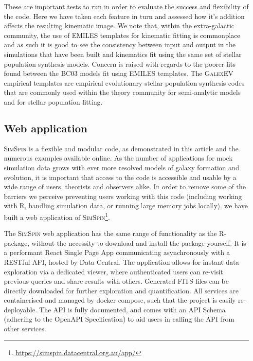 \documentclass[
  journal=pasa,
  manuscript=research-paper, %
  year=2020,
  volume=37,
]{cup-journal}
\newcommand{\simspin}[1]{\textsc{SimSpin}#1} %
\begin{document}
\vspace{0.5cm}

These are important tests to run in order to evaluate the success and flexibility of the code. 
Here we have taken each feature in turn and assessed how it's addition affects the resulting kinematic image. 
We note that, within the extra-galactic community, the use of EMILES templates for kinematic fitting is commonplace and as such it is good to see the consistency between input and output in the simulations that have been built and kinematics fit using the same set of stellar population synthesis models. 
Concern is raised with regards to the poorer fits found between the BC03 models fit using EMILES templates. 
The \textsc{GalexEV} empirical templates are empirical evolutionary stellar population synthesis codes that are commonly used within the theory community for semi-analytic models and for stellar population fitting. 

\vspace{0.5cm}

\subsection{Web application}
\simspin{} is a flexible and modular code, as demonstrated in this article and the numerous examples available online. 
As the number of applications for mock simulation data grows with ever more resolved models of galaxy formation and evolution, it is important that access to the code is accessible and usable by a wide range of users, theorists and observers alike.
In order to remove some of the barriers we perceive preventing users working with this code (including working with \small{R}, handling simulation data, or running large memory jobs locally), we have built a web application of \simspin  \footnote{\url{https://simspin.datacentral.org.au/app/}}. 

The \simspin{} web application has the same range of functionality as the R-package, without the necessity to download and install the package yourself.
It is a performant React Single Page App communicating asynchronously with a RESTful API, hosted by Data Central. 
The application allows for instant data exploration via a dedicated viewer, where authenticated users can re-visit previous queries and share results with others. 
Generated FITS files can be directly downloaded for further exploration and quantification. 
All services are containerised and managed by docker compose, such that the project is easily re-deployable. 
The API is fully documented, and comes with an API Schema (adhering to the OpenAPI Specification) to aid users in calling the API from other services.
\end{document}
